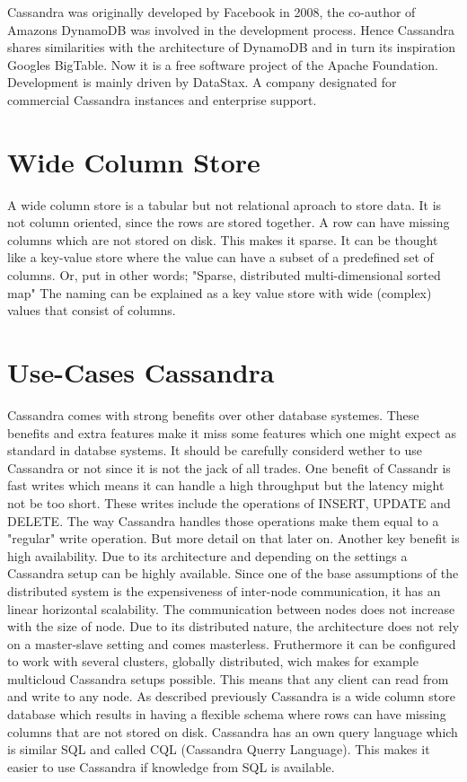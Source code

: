 Cassandra was originally developed by Facebook in 2008, the co-author of Amazons DynamoDB was involved
in the development process. Hence Cassandra shares similarities with the architecture of DynamoDB and in turn its inspiration Googles BigTable.
Now it is a free software project of the Apache Foundation. Development is mainly driven by DataStax.
A company designated for commercial Cassandra instances and enterprise support.

\section{Wide Column Store}

A wide column store is a tabular but not relational aproach to store data. It is not column oriented, since the rows are stored together. A row can have missing columns which are not stored on disk. This makes it sparse.
It can be thought like a key-value store where the value can have a subset of a predefined set of columns. Or, put in other words; "Sparse, distributed multi-dimensional sorted map" \cite{chang2008bigtable}
The naming can be explained as a key value store with wide (complex) values that consist of columns.

\section{Use-Cases Cassandra}
Cassandra comes with strong benefits over other database systemes. These benefits and extra features make it miss some features which one might expect as standard in databse systems.
It should be carefully considerd wether to use Cassandra or not since it is not the jack of all trades.
One benefit of Cassandr is fast writes which means it can handle a high throughput but the latency might not be too short. These writes include the operations of {INSERT}, {UPDATE} and {DELETE}. 
The way Cassandra handles those operations make them equal to a "regular" write operation. But more detail on that later on. Another key benefit is high availability. Due to its architecture and depending on the settings 
a Cassandra setup can be highly available. Since one of the base assumptions of the distributed system is the expensiveness of inter-node communication, it has an linear horizontal scalability. 
The communication between nodes does not increase with the size of node. Due to its distributed nature, the architecture does not rely on a master-slave setting and comes masterless. 
Fruthermore it can be configured to work with several clusters, globally distributed, wich makes for example multicloud Cassandra setups possible.
This means that any client can read from and write to any node. As described previously Cassandra is a wide column store database which results in having a flexible schema where rows can have missing columns that are not stored on disk.
Cassandra has an own query language which is similar SQL and called CQL (Cassandra Querry Language). This makes it easier to use Cassandra if knowledge from SQL is available.


